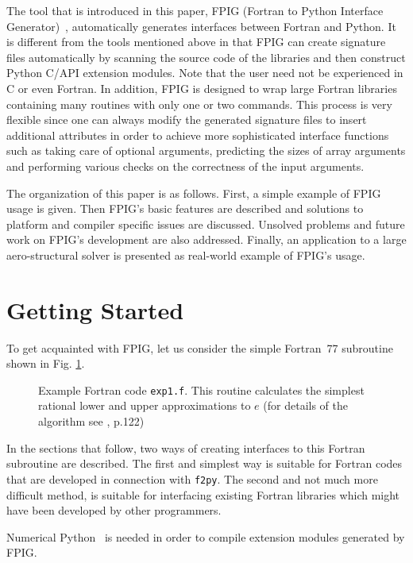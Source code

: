 \documentclass[twocolumn]{article}
\newcommand{\fpy}{\texttt{f2py}\xspace}
\newcommand{\tthhide}[1]{#1}
\newcommand{\latexhide}[1]{}
\begin{document}
The tool that is introduced in this paper, FPIG (Fortran to Python
Interface Generator)~\cite{fpig}, automatically generates interfaces
between Fortran and Python.  It is different from the tools mentioned
above in that FPIG can create signature files automatically by
scanning the source code of the libraries and then construct Python
C/API extension modules.  Note that the user need not be experienced
in C or even Fortran.  In addition, FPIG is designed to wrap large
Fortran libraries containing many routines with only one or two
commands.  This process is very flexible since one can always modify
the generated signature files to insert additional attributes in order
to achieve more sophisticated interface functions such as taking care
of optional arguments, predicting the sizes of array arguments and
performing various checks on the correctness of the input arguments.

The organization of this paper is as follows. First, a simple example
of FPIG usage is given. Then FPIG's basic features are described and
solutions to platform and compiler specific issues are discussed.
Unsolved problems and future work on FPIG's development are also
addressed.  Finally, an application to a large aero-structural solver
is presented as real-world example of FPIG's usage.

\section{Getting Started}
\label{sec:getstart}

To get acquainted with FPIG, let us consider the simple Fortran~77
subroutine shown in Fig. \ref{fig:exp1.f}.
\begin{figure}[htb]
  \latexhide{\label{fig:exp1.f}}
  
  \caption{Example Fortran code \texttt{exp1.f}. This routine calculates
 the simplest rational lower and upper approximations to $e$ (for
   details of
    the algorithm see \cite{graham-etal}, p.122)}
  \tthhide{\label{fig:exp1.f}}
\end{figure}
In the sections that follow, two ways of creating interfaces to this
Fortran subroutine are described. The first and simplest way is
suitable for Fortran codes that are developed in connection with \fpy.
The second and not much more difficult method, is suitable for
interfacing existing Fortran libraries which might have been developed
by other programmers.

Numerical Python~\cite{numpy} is needed in order to compile extension
modules generated by FPIG.
\end{document}
